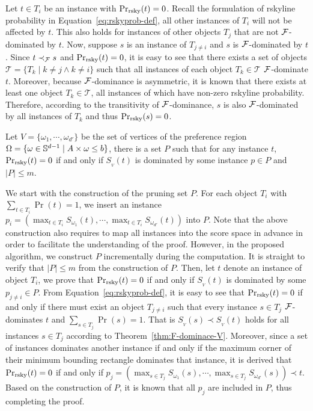 \begin{IEEEproof}
	Let $t \in T_i$ be an instance with $\Pr_{\rm rsky}(t) = 0$.
	Recall the formulation of rskyline probability in Equation~\ref{eq:rskyprob-def}, all other instances of $T_i$ will not be affected by $t$.
	This also holds for instances of other objects $T_j$ that are not $\mathcal{F}$-dominated by $t$.
	Now, suppose $s$ is an instance of $T_{j \ne i}$ and $s$ is $\mathcal{F}$-dominated by $t$.
	Since $t \prec_{\mathcal{F}} s$ and $\Pr_{\rm rsky}(t) = 0$, it is easy to see that there exists a set of objects $\mathcal{T} = \{T_k \mid k \ne j \wedge k \ne i\}$ such that all instances of each object $T_k \in \mathcal{T}$ $\mathcal{F}$-dominate $t$.
	Moreover, because $\mathcal{F}$-dominance is asymmetric, it is known that there exists at least one object $T_k \in \mathcal{T}$, all instances of which have non-zero rskyline probability.
	Therefore, according to the transitivity of $\mathcal{F}$-dominance, $s$ is also $\mathcal{F}$-dominated by all instances of $T_k$ and thus $\Pr_{\rm rsky}(s) = 0$.
\end{IEEEproof}

\begin{theorem}
	Let $V = \{\omega_1, \cdots, \omega_{d'}\}$ be the set of vertices of the preference region $\Omega = \{\omega \in \mathbb{S}^{d-1} \mid A \times \omega \le b\}$, there is a set $P$ such that for any instance $t$, ${\rm Pr}_{\rm rsky}(t) = 0$ if and only if $S_{_V}(t)$ is dominated by some instance $p \in P$ and $|P| \le m$.
\end{theorem}

\begin{IEEEproof}
	We start with the construction of the pruning set $P$.
	For each object $T_i$ with $\sum_{t \in T_i} \Pr(t) = 1$, we insert an instance $p_i = (\max_{t \in T_i}S_{\omega_1}(t), \cdots, \max_{t \in T_i}S_{\omega_{d'}}(t))$ into $P$.
	Note that the above construction also requires to map all instances into the score space in advance in order to facilitate the understanding of the proof.
	However, in the proposed algorithm, we construct $P$ incrementally during the computation.
	It is straight to verify that $|P| \le m$ from the construction of $P$.
	Then, let $t$ denote an instance of object $T_i$, we prove that $\Pr_{\rm rsky}(t) = 0$ if and only if $S_{_V}(t)$ is dominated by some $p_{j \ne i} \in P$.
	From Equation~\ref{eq:rskyprob-def}, it is easy to see that $\Pr_{\rm rsky}(t) = 0$ if and only if there must exist an object $T_{j \ne i}$ such that every instance $s \in T_j$ $\mathcal{F}$-dominates $t$ and $\sum_{s \in T_j} \Pr(s) = 1$.
	That is $S_{_V}(s) \prec S_{_V}(t)$ holds for all instances $s \in T_j$ according to Theorem~\ref{thm:F-dominace-V}.
	Moreover, since a set of instances dominates another instance if and only if the maximum corner of their minimum bounding rectangle dominates that instance, it is derived that $\Pr_{\rm rsky}(t) = 0$ if and only if $p_j = (\max_{s \in T_j}S_{\omega_1}(s), \cdots, \max_{s \in T_j}S_{\omega_{d'}}(s)) \prec t$.
	Based on the construction of $P$, it is known that all $p_j$ are included in $P$, thus completing the proof.
\end{IEEEproof}


